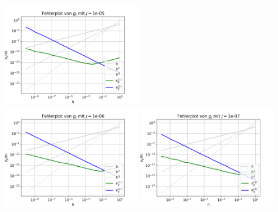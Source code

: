 \documentclass{scrartcl}
\begin{document}
{    \includegraphics[width=0.45\textwidth]{Grafiken/Fehlerplot_j000001}\\
    \includegraphics[width=0.45\textwidth]{Grafiken/Fehlerplot_j0000001}
    \includegraphics[width=0.45\textwidth]{Grafiken/Fehlerplot_j00000001}\\
    \vspace{-0.2cm}
    \vspace{0.5cm}
  }
\end{document}
